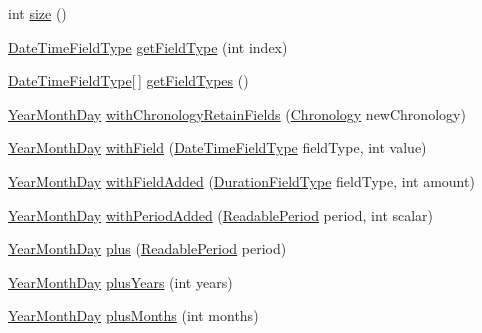 \begin{DoxyCompactItemize}
\item 
int \hyperlink{classorg_1_1joda_1_1time_1_1_year_month_day_a1362ea5e109576271f038e1567e87990}{size} ()
\item 
\hyperlink{classorg_1_1joda_1_1time_1_1_date_time_field_type}{Date\-Time\-Field\-Type} \hyperlink{classorg_1_1joda_1_1time_1_1_year_month_day_ab0cfb49acf5a5516f9cb2685d8cb73f7}{get\-Field\-Type} (int index)
\item 
\hyperlink{classorg_1_1joda_1_1time_1_1_date_time_field_type}{Date\-Time\-Field\-Type}\mbox{[}$\,$\mbox{]} \hyperlink{classorg_1_1joda_1_1time_1_1_year_month_day_a37795e8daf788a96afa9572e9a8da4dd}{get\-Field\-Types} ()
\item 
\hyperlink{classorg_1_1joda_1_1time_1_1_year_month_day}{Year\-Month\-Day} \hyperlink{classorg_1_1joda_1_1time_1_1_year_month_day_a4ff42b56fc783379ea32a8ba24e3197c}{with\-Chronology\-Retain\-Fields} (\hyperlink{classorg_1_1joda_1_1time_1_1_chronology}{Chronology} new\-Chronology)
\item 
\hyperlink{classorg_1_1joda_1_1time_1_1_year_month_day}{Year\-Month\-Day} \hyperlink{classorg_1_1joda_1_1time_1_1_year_month_day_af5c8291eb8ec079e30263e6eda5afa06}{with\-Field} (\hyperlink{classorg_1_1joda_1_1time_1_1_date_time_field_type}{Date\-Time\-Field\-Type} field\-Type, int value)
\item 
\hyperlink{classorg_1_1joda_1_1time_1_1_year_month_day}{Year\-Month\-Day} \hyperlink{classorg_1_1joda_1_1time_1_1_year_month_day_a2e926be764904e4f2f0f16f7450f8aae}{with\-Field\-Added} (\hyperlink{classorg_1_1joda_1_1time_1_1_duration_field_type}{Duration\-Field\-Type} field\-Type, int amount)
\item 
\hyperlink{classorg_1_1joda_1_1time_1_1_year_month_day}{Year\-Month\-Day} \hyperlink{classorg_1_1joda_1_1time_1_1_year_month_day_a4f69509d5615fef6db397561ae44f834}{with\-Period\-Added} (\hyperlink{interfaceorg_1_1joda_1_1time_1_1_readable_period}{Readable\-Period} period, int scalar)
\item 
\hyperlink{classorg_1_1joda_1_1time_1_1_year_month_day}{Year\-Month\-Day} \hyperlink{classorg_1_1joda_1_1time_1_1_year_month_day_ad83f7924eaf5534133000434e3f54d35}{plus} (\hyperlink{interfaceorg_1_1joda_1_1time_1_1_readable_period}{Readable\-Period} period)
\item 
\hyperlink{classorg_1_1joda_1_1time_1_1_year_month_day}{Year\-Month\-Day} \hyperlink{classorg_1_1joda_1_1time_1_1_year_month_day_ada11287f81e6eb6d5ad09ac83b86f19f}{plus\-Years} (int years)
\item 
\hyperlink{classorg_1_1joda_1_1time_1_1_year_month_day}{Year\-Month\-Day} \hyperlink{classorg_1_1joda_1_1time_1_1_year_month_day_a21ccf049cf5281fd4538b1c5c7e2edb4}{plus\-Months} (int months)

\end{DoxyCompactItemize}
